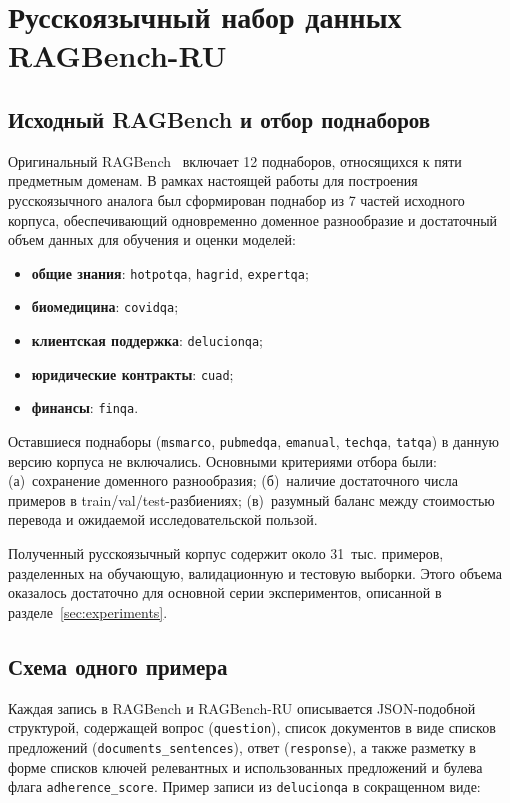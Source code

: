 \section{Русскоязычный набор данных RAGBench-RU}
\label{sec:dataset}

\subsection{Исходный RAGBench и отбор поднаборов}

Оригинальный RAGBench~\cite{friel2024ragbench} включает 12 поднаборов,
относящихся к пяти предметным доменам. В рамках настоящей работы для построения
русскоязычного аналога был сформирован поднабор из 7 частей исходного корпуса, обеспечивающий
одновременно доменное разнообразие и достаточный объем данных для обучения и оценки
моделей:

\begin{itemize}
  \item \textbf{общие знания}: \texttt{hotpotqa}, \texttt{hagrid}, \texttt{expertqa};
  \item \textbf{биомедицина}: \texttt{covidqa};
  \item \textbf{клиентская поддержка}: \texttt{delucionqa};
  \item \textbf{юридические контракты}: \texttt{cuad};
  \item \textbf{финансы}: \texttt{finqa}.
\end{itemize}

Оставшиеся поднаборы (\texttt{msmarco}, \texttt{pubmedqa}, \texttt{emanual},
\texttt{techqa}, \texttt{tatqa}) в данную версию корпуса не включались. Основными
критериями отбора были:
(а)~сохранение доменного разнообразия;
(б)~наличие достаточного числа примеров в train/val/test-разбиениях;
(в)~разумный баланс между стоимостью перевода и ожидаемой исследовательской пользой.

Полученный русскоязычный корпус содержит около 31~тыс. примеров, разделенных на
обучающую, валидационную и тестовую выборки. Этого объема оказалось достаточно для
основной серии экспериментов, описанной в разделе~\ref{sec:experiments}.

\subsection{Схема одного примера}

Каждая запись в RAGBench и RAGBench-RU описывается JSON-подобной структурой,
содержащей вопрос (\texttt{question}), список документов в виде списков предложений
(\texttt{documents\_sentences}), ответ (\texttt{response}), а также разметку в форме
списков ключей релевантных и использованных предложений и булева флага
\texttt{adherence\_score}. Пример записи из \texttt{delucionqa} в сокращенном виде:

